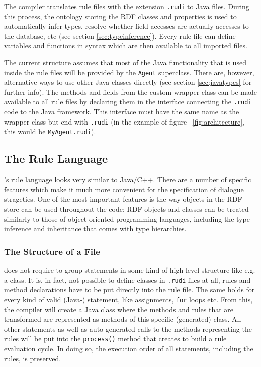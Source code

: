 The \vonda compiler translates rule files with the extension \texttt{.rudi} to
Java files. During this process, the ontology storing the RDF classes and
properties is used to automatically infer types, resolve whether field accesses
are actually accesses to the database, etc (see section
\ref{sec:typeinference}).
Every rule file can define variables and functions in \vonda syntax which are
then available to all imported files.

The current structure assumes that most of the Java functionality that is used
inside the rule files will be provided by the \texttt{Agent} superclass. There
are, however, alternative ways to use other Java classes directly (see section
\ref{sec:javatypes} for further info).  The methods and fields from the custom
wrapper class can be made available to all rule files by declaring them in the
interface connecting the \texttt{.rudi} code to the Java framework. This
interface must have the same name as the wrapper class but end with
\texttt{.rudi} (in the example of figure ~\ref{fig:architecture}, this would be
\texttt{MyAgent.rudi}).

\subsection{The \vonda Rule Language}
\label{sec:language}

\vonda's rule language looks very similar to Java/C++. There are a number of
specific features which make it much more convenient for the specification of
dialogue strageties. One of the most important features is the way objects in
the RDF store can be used throughout the code: RDF objects and classes can be
treated similarly to those of object oriented programming languages, including
the type inference and inheritance that comes with type hierarchies.

\subsubsection{The Structure of a \vonda File}

\vonda does not require to group statements in some kind of high-level
structure like e.g. a class. It is, in fact, not possible to define classes in
\texttt{.rudi} files at all, rules and method declarations have to be put
directly into the rule file. The same holds for every kind of valid
(Java-) statement, like assignments, \texttt{for} loops etc. From this, the
compiler will create a Java class where the methods and rules that are
transformed are represented as methods of this specific (generated)
class. All other statements as well as auto-generated calls to the methods
representing the rules will be put into the \texttt{process()} method that
\vonda creates to build a rule evaluation cycle. In doing so, the execution
order of all statements, including the rules, is preserved.

